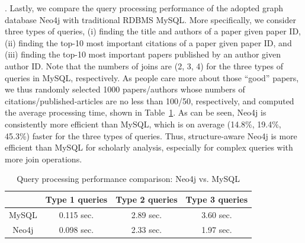 .
Lastly, we compare the query processing performance of the adopted graph database Neo4j with traditional RDBMS MySQL. More specifically, we consider three types of queries, \ie (i) finding the title and authors of a paper given paper ID, (ii) finding the top-10 most important citations of a paper given paper ID, and (iii) finding the top-10 most important papers published by an author given author ID.
Note that the numbers of joins are (2, 3, 4) for the three types of queries in MySQL, respectively. As people care more about those ``good'' papers, we thus randomly selected 1000 papers/authors whose numbers of citations/published-articles are no less than 100/50, respectively, and computed the average processing time, shown in Table~\ref{tab-compare}.
As can be seen, Neo4j is consistently more efficient than MySQL, which is on average (14.8\%, 19.4\%, 45.3\%) faster for the three types of queries.
Thus, structure-aware Neo4j is more efficient than MySQL for scholarly analysis, especially for complex queries with more join operations.


\begin{table}[t!]
\begin{center}
\caption{Query processing performance comparison: Neo4j vs. MySQL}
\vspace{-2ex}
\label{tab-compare}
\begin{scriptsize}
\begin{tabular}{c c c c} %
\hline
{} & {Type 1 queries} & {Type 2 queries} & {Type 3 queries}\\
\hline
MySQL & 0.115 sec.  & 2.89 sec. & 3.60 sec. \\
Neo4j & 0.098 sec.  & 2.33 sec. & 1.97 sec. \\
\hline
\end{tabular}
\end{scriptsize}
\vspace{-3ex}
\end{center}
\end{table}



